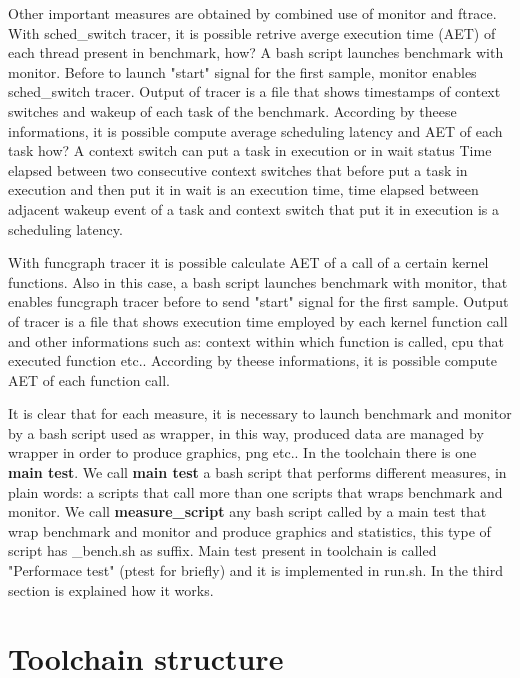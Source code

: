 \documentclass[a4paper,10pt]{article}
\begin{document}
\begin{multicols}{2}
Other important measures are obtained by combined use of monitor and ftrace.
With sched\_switch tracer, it is possible retrive averge execution time (AET) of each
thread present in benchmark, how? A bash script launches benchmark with monitor. 
Before to launch "start" signal for the first sample, monitor enables sched\_switch tracer. 
Output of tracer is a file that shows timestamps of context switches and
wakeup of each task of the benchmark. According by theese informations, it is possible
compute average scheduling latency and AET of each task how? A context switch can put a task in execution or in wait status 
Time elapsed between two consecutive context switches that before put a task in execution and then put it in wait is an execution time,
time elapsed between adjacent wakeup event of a task and context switch that put it in execution is a scheduling latency.

With funcgraph tracer it is possible calculate AET of a call of a certain kernel functions. Also in this case, a bash script launches
benchmark with monitor, that enables funcgraph tracer before to send "start" signal
for the first sample. Output of tracer is a file that shows execution time employed by each
kernel function call and other informations such as: context within which function is called,
cpu that executed function etc..
According by theese informations, it is possible compute AET of each function call.

It is clear that for each measure, it is necessary to launch benchmark and monitor by 
a bash script used as wrapper, in this way, produced data are managed by wrapper in order
to produce graphics, png etc..
In the toolchain there is one \textbf{main test}. We call \textbf{main test} a bash script that 
performs different measures, in plain words: a scripts that call more than one
scripts that wraps benchmark and monitor. We call \textbf{measure\_script} any bash script called
by a main test that wrap benchmark and monitor and produce graphics and statistics, this type of script has \_bench.sh as suffix. 
Main test present in toolchain is called "Performace test" (ptest for briefly)
and it is implemented in run.sh. In the third section is explained how it works. 

\section{Toolchain structure}


\end{multicols}
\end{document}
